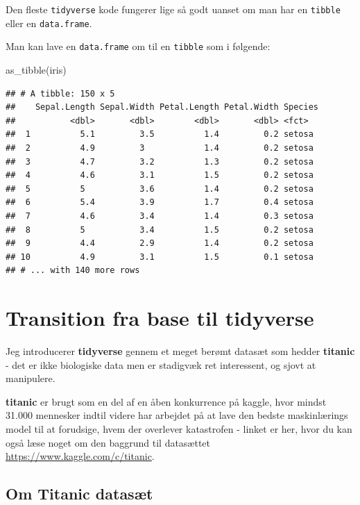 \documentclass[
]{book}
\newenvironment{Shaded}{\begin{snugshade}}{\end{snugshade}}
\newcommand{\FunctionTok}[1]{\textcolor[rgb]{0.00,0.00,0.00}{#1}}
\newcommand{\NormalTok}[1]{#1}
\begin{document}
Den fleste \texttt{tidyverse} kode fungerer lige så godt uanset om man har en \texttt{tibble} eller en \texttt{data.frame}.

Man kan lave en \texttt{data.frame} om til en \texttt{tibble} som i følgende:

\begin{Shaded}
\begin{Highlighting}[]
\FunctionTok{as\_tibble}\NormalTok{(iris)}
\end{Highlighting}
\end{Shaded}

\begin{verbatim}
## # A tibble: 150 x 5
##    Sepal.Length Sepal.Width Petal.Length Petal.Width Species
##           <dbl>       <dbl>        <dbl>       <dbl> <fct>  
##  1          5.1         3.5          1.4         0.2 setosa 
##  2          4.9         3            1.4         0.2 setosa 
##  3          4.7         3.2          1.3         0.2 setosa 
##  4          4.6         3.1          1.5         0.2 setosa 
##  5          5           3.6          1.4         0.2 setosa 
##  6          5.4         3.9          1.7         0.4 setosa 
##  7          4.6         3.4          1.4         0.3 setosa 
##  8          5           3.4          1.5         0.2 setosa 
##  9          4.4         2.9          1.4         0.2 setosa 
## 10          4.9         3.1          1.5         0.1 setosa 
## # ... with 140 more rows
\end{verbatim}

\hypertarget{transition-fra-base-til-tidyverse}{%
\section{Transition fra base til tidyverse}\label{transition-fra-base-til-tidyverse}}

Jeg introducerer \textbf{tidyverse} gennem et meget berømt datasæt som hedder \textbf{titanic} - det er ikke biologiske data men er stadigvæk ret interessent, og sjovt at manipulere.

\textbf{titanic} er brugt som en del af en åben konkurrence på kaggle, hvor mindst 31.000 mennesker indtil videre har arbejdet på at lave den bedste maskinlærings model til at forudsige, hvem der overlever katastrofen - linket er her, hvor du kan også læse noget om den baggrund til datasættet \url{https://www.kaggle.com/c/titanic}.

\hypertarget{om-titanic-datasuxe6t}{%
\subsection{\texorpdfstring{Om \textbf{Titanic} datasæt}{Om Titanic datasæt}}\label{om-titanic-datasuxe6t}}
\end{document}
